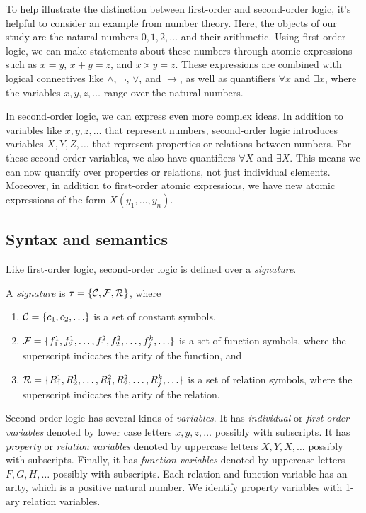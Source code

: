 \documentclass[11pt,twoside=off,numbers=noenddot]{scrbook}
\begin{document}
To help illustrate the distinction between first-order and second-order logic, it's helpful to consider an example from number theory. Here, the objects of our study are the natural numbers $0, 1, 2, \dots$ and their arithmetic. Using first-order logic, we can make statements about these numbers through atomic expressions such as $x = y$, $x + y = z$, and $x \times y = z$. These expressions are combined with logical connectives like $\wedge$, $\neg$, $\vee$, and $\rightarrow$, as well as quantifiers $\forall x$ and $\exists x$, where the variables $x, y, z, \dots$ range over the natural numbers.

In second-order logic, we can express even more complex ideas. In addition to variables like $x, y, z, \dots$ that represent numbers, second-order logic introduces variables $X, Y, Z, \dots$ that represent properties or relations between numbers. For these second-order variables, we also have quantifiers $\forall X$ and $\exists X$. This means we can now quantify over properties or relations, not just individual elements. Moreover, in addition to first-order atomic expressions, we have new atomic expressions of the form $X(y_1, \dots, y_n)$.

\subsection{Syntax and semantics}
Like first-order logic, second-order logic is defined over a \emph{signature}.

\begin{definition}
  A \emph{signature} is $\tau = \{ \mathcal{C}, \mathcal{F}, \mathcal{R} \}$, where
  \begin{enumerate}
    \item $\consts = \set{c_1, c_2, \dots}$ is a set of constant symbols,
    \item $\funcs = \set{f_1^1, f_2^1, \dots, f_1^2, f_2^2, \dots, f_j^k, \dots}$ is a set of function symbols, where the superscript indicates the arity of the function, and
    \item $\rels = \set{R_1^1, R_2^1, \dots, R_1^2, R_2^2, \dots, R_j^k, \dots}$ is a set of relation symbols, where the superscript indicates the arity of the relation.
  \end{enumerate}
\end{definition}

Second-order logic has several kinds of \emph{variables}. It has \emph{individual} or \emph{first-order variables} denoted by lower case letters $x, y, z, \dots$ possibly with subscripts. It has \emph{property} or \emph{relation variables} denoted by uppercase letters $X, Y, X, \dots$ possibly with subscripts. Finally, it has \emph{function variables} denoted by uppercase letters $F, G, H, \dots$ possibly with subscripts. Each relation and function variable has an arity, which is a positive natural number. We identify property variables with 1-ary relation variables.
\end{document}
